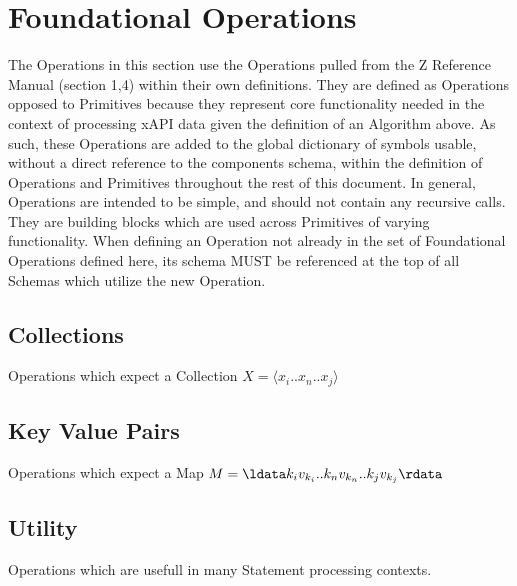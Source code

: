 \documentclass{article}
\begin{document}





\section{Foundational Operations}
The Operations in this section use the Operations pulled from the Z Reference Manual (section 1,4) within their own definitions.
They are defined as Operations opposed to Primitives because they represent core functionality needed in the context
of processing xAPI data given the definition of an Algorithm above. As such, these Operations are added to the global
dictionary of symbols usable, without a direct reference to the components schema, within the definition of
Operations and Primitives throughout the rest of this document. In general, Operations are intended to be
simple, and should not contain any recursive calls. They are building blocks which are used across Primitives
of varying functionality. When defining an Operation not already in the set of Foundational Operations defined here, its schema
MUST be referenced at the top of all Schemas which utilize the new Operation.

\subsection{Collections}
Operations which expect a Collection $X = \langle x_{i}..x_{n}..x_{j} \rangle$






\subsection{Key Value Pairs}
Operations which expect a Map $M = \ldata k_{i}v_{k_{i}}..k_{n}v_{k_{n}}..k_{j}v_{k_{j}} \rdata$






\subsection{Utility}
Operations which are usefull in many Statement processing contexts.




\end{document}
